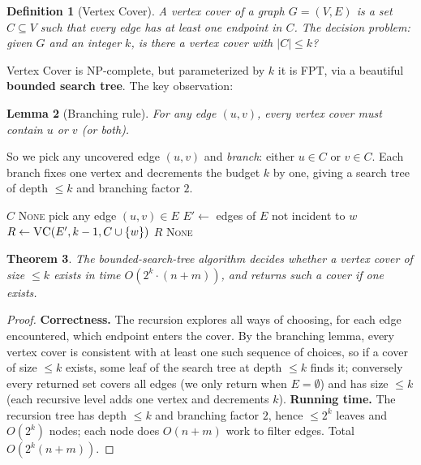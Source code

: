 \documentclass[11pt]{article}
\newtheorem{theorem}{Theorem}[section]
\newtheorem{lemma}[theorem]{Lemma}
\newtheorem{definition}[theorem]{Definition}
\begin{document}
\begin{definition}[Vertex Cover]
A \emph{vertex cover} of a graph $G=(V,E)$ is a set $C \subseteq V$ such that
every edge has at least one endpoint in $C$. The decision problem: given $G$
and an integer $k$, is there a vertex cover with $|C| \le k$?
\end{definition}

Vertex Cover is NP-complete, but parameterized by $k$ it is FPT, via a beautiful
\textbf{bounded search tree}. The key observation:

\begin{lemma}[Branching rule]
For any edge $(u,v)$, every vertex cover must contain $u$ or $v$ (or both).
\end{lemma}

So we pick any uncovered edge $(u,v)$ and \emph{branch}: either $u \in C$ or
$v \in C$. Each branch fixes one vertex and decrements the budget $k$ by one,
giving a search tree of depth $\le k$ and branching factor $2$.

\begin{algorithm}[h]
\caption{FPT Vertex Cover (bounded search tree)}
\begin{algorithmic}[1]
     \Return $C$  \EndIf
     \Return \textsc{None}  \EndIf
    \State pick any edge $(u,v) \in E$
        \State $E' \gets$ edges of $E$ not incident to $w$
        \State $R \gets \textsc{VC}(E', k-1, C \cup \{w\})$
         \Return $R$ \EndIf
    \EndFor
    \State \Return \textsc{None}
\EndFunction
\end{algorithmic}
\end{algorithm}

\begin{theorem}
\label{thm:vc-fpt}
The bounded-search-tree algorithm decides whether a vertex cover of size $\le k$
exists in time $O(2^k \cdot (n+m))$, and returns such a cover if one exists.
\end{theorem}

\begin{proof}
\textbf{Correctness.} The recursion explores all ways of choosing, for each
edge encountered, which endpoint enters the cover. By the branching lemma, every
vertex cover is consistent with at least one such sequence of choices, so if a
cover of size $\le k$ exists, some leaf of the search tree at depth $\le k$
finds it; conversely every returned set covers all edges (we only return when
$E=\emptyset$) and has size $\le k$ (each recursive level adds one vertex and
decrements $k$). \textbf{Running time.} The recursion tree has depth $\le k$ and
branching factor $2$, hence $\le 2^k$ leaves and $O(2^k)$ nodes; each node does
$O(n+m)$ work to filter edges. Total $O(2^k(n+m))$.
\end{proof}
\end{document}
